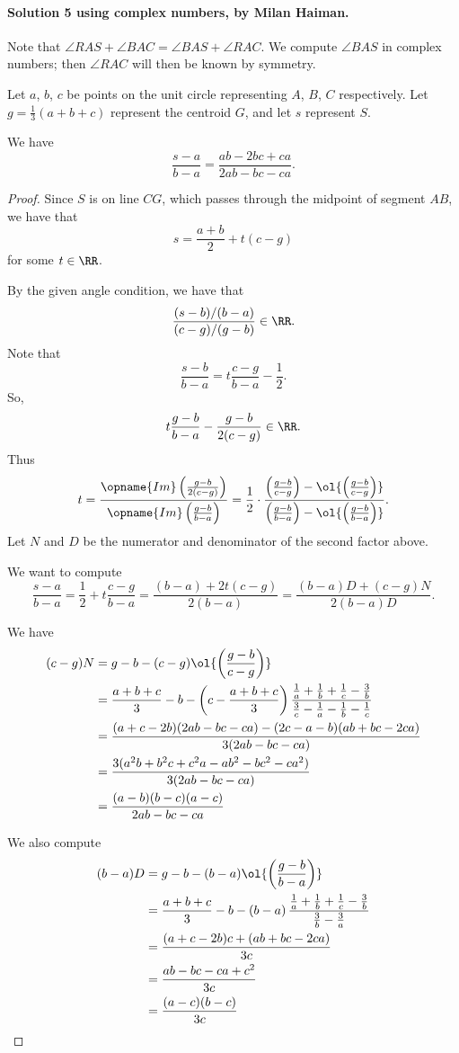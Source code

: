 \documentclass[11pt]{scrartcl}
\begin{document}
\paragraph{Solution 5 using complex numbers, by Milan Haiman.}
Note that $\angle RAS + \angle BAC=\angle BAS+\angle RAC$.
We compute $\angle BAS$ in complex numbers;
then $\angle RAC$ will then be known by symmetry.

Let $a$, $b$, $c$ be points on the unit circle representing $A$, $B$, $C$ respectively.
Let $g=\frac{1}{3}(a+b+c)$ represent the centroid $G$,
and let $s$ represent $S$.

\begin{claim*}
  We have
  \[ \frac{s-a}{b-a} = \frac{ab-2bc+ca}{2ab-bc-ca}. \]
\end{claim*}
\begin{proof}
Since $S$ is on line $CG$, which passes through the midpoint of segment $AB$, we
have that \[ s=\frac{a+b}{2}+t(c-g) \] for some $t\in\RR$.

By the given angle condition, we have that
\[ \frac{(s-b)/(b-a)}{(c-g)/(g-b)}\in\RR. \]
Note that \[ \frac{s-b}{b-a}=t\frac{c-g}{b-a}-\frac{1}{2}. \]
So, \[ t\frac{g-b}{b-a}-\frac{g-b}{2(c-g)}\in \RR. \]
Thus
\[
  t = \frac{\opname{Im} \left(\frac{g-b}{2(c-g)}\right)}
  {\opname{Im} \left(\frac{g-b}{b-a}\right)}
  = \frac{1}{2} \cdot \frac
    {\left(\frac{g-b}{c-g}\right)-\ol{\left(\frac{g-b}{c-g}\right)}}
    {\left(\frac{g-b}{b-a}\right)-\ol{\left(\frac{g-b}{b-a}\right)}}.
\]
Let $N$ and $D$ be the numerator and denominator of the second factor above.

We want to compute
\[ \frac{s-a}{b-a}
   = \frac{1}{2}+t\frac{c-g}{b-a}
   = \frac{(b-a)+2t(c-g)}{2(b-a)}
   = \frac{(b-a)D+(c-g)N}{2(b-a)D}. \]

We have
\begin{align*}
    (c-g)N &= g-b-(c-g)\ol{\left(\frac{g-b}{c-g}\right)} \\
    &= \frac{a+b+c}{3}-b-\left(c-\frac{a+b+c}{3}\right)\frac{\frac{1}{a}+\frac{1}{b}+\frac{1}{c}-\frac{3}{b}}{\frac{3}{c}-\frac{1}{a}-\frac{1}{b}-\frac{1}{c}}\\
    &= \frac{(a+c-2b)(2ab-bc-ca)-(2c-a-b)(ab+bc-2ca)}{3(2ab-bc-ca)}\\
    &= \frac{3(a^2b+b^2c+c^2a-ab^2-bc^2-ca^2)}{3(2ab-bc-ca)}\\
    &= \frac{(a-b)(b-c)(a-c)}{2ab-bc-ca}
\end{align*}

We also compute \begin{align*}
    (b-a)D&=g-b-(b-a)\ol{\left(\frac{g-b}{b-a}\right)} \\
    &=\frac{a+b+c}{3}-b-\left(b-a\right)\frac{\frac{1}{a}+\frac{1}{b}+\frac{1}{c}-\frac{3}{b}}{\frac{3}{b}-\frac{3}{a}}\\
    &=\frac{(a+c-2b)c+(ab+bc-2ca)}{3c}\\
    &=\frac{ab-bc-ca+c^2}{3c}\\
    &=\frac{(a-c)(b-c)}{3c}
\end{align*}


\end{proof}
\end{document}
